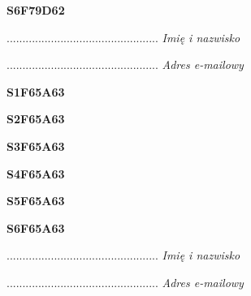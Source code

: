 \begin{turn}{90}\huge \textbf{S6F79D62}\end{turn}

\begin{turn}{90}\begin{minipage}{\linewidth} \vspace{20mm} ................................................  \textit{Imię i nazwisko}\end{minipage}\end{turn}

\begin{turn}{90}\begin{minipage}{\linewidth} \vspace{20mm} ................................................  \textit{Adres e-mailowy}\end{minipage}\end{turn}

\begin{turn}{90}\huge \textbf{S1F65A63}\end{turn}

\begin{turn}{90}\huge \textbf{S2F65A63}\end{turn}

\begin{turn}{90}\huge \textbf{S3F65A63}\end{turn}

\begin{turn}{90}\huge \textbf{S4F65A63}\end{turn}

\begin{turn}{90}\huge \textbf{S5F65A63}\end{turn}

\begin{turn}{90}\huge \textbf{S6F65A63}\end{turn}

\begin{turn}{90}\begin{minipage}{\linewidth} \vspace{20mm} ................................................  \textit{Imię i nazwisko}\end{minipage}\end{turn}

\begin{turn}{90}\begin{minipage}{\linewidth} \vspace{20mm} ................................................  \textit{Adres e-mailowy}\end{minipage}\end{turn}

